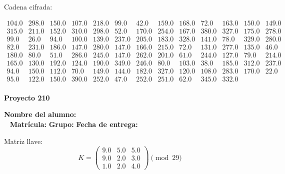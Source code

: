 \documentclass[12pt]{article}
\begin{document}
Cadena cifrada:
\begin{center}
$\begin{array}{lllllllllllll}
104.0 & 298.0 & 150.0 & 107.0 & 218.0 & 99.0 & 42.0 & 159.0 & 168.0 & 72.0 & 163.0 & 150.0 & 149.0\\
315.0 & 211.0 & 152.0 & 310.0 & 298.0 & 52.0 & 170.0 & 254.0 & 167.0 & 380.0 & 327.0 & 175.0 & 278.0\\
99.0 & 26.0 & 94.0 & 100.0 & 139.0 & 237.0 & 205.0 & 183.0 & 328.0 & 141.0 & 78.0 & 329.0 & 280.0\\
82.0 & 231.0 & 186.0 & 147.0 & 280.0 & 147.0 & 166.0 & 215.0 & 72.0 & 131.0 & 277.0 & 135.0 & 46.0\\
180.0 & 80.0 & 51.0 & 286.0 & 245.0 & 147.0 & 262.0 & 201.0 & 61.0 & 244.0 & 127.0 & 79.0 & 214.0\\
165.0 & 130.0 & 192.0 & 124.0 & 190.0 & 349.0 & 246.0 & 80.0 & 103.0 & 38.0 & 185.0 & 312.0 & 237.0\\
94.0 & 150.0 & 112.0 & 70.0 & 149.0 & 144.0 & 182.0 & 327.0 & 120.0 & 108.0 & 283.0 & 170.0 & 22.0\\
95.0 & 122.0 & 150.0 & 390.0 & 252.0 & 47.0 & 252.0 & 251.0 & 62.0 & 345.0 & 332.0\\
\end{array}$
\end{center}

\newpage


\textbf{Proyecto 210}

\textbf{Nombre del alumno:} \underline{\hspace{13cm}}\\\
\vspace{1cm}
\textbf{Matrícula:} \underline{\hspace{4cm}} \hspace{1cm}
\textbf{Grupo:} \underline{\hspace{2cm}}
\textbf{Fecha de entrega:} \underline{\hspace{2cm}}

\medskip

Matriz llave:
\[
K = \begin{pmatrix}
9.0 & 5.0 & 5.0\\
9.0 & 2.0 & 3.0\\
1.0 & 2.0 & 4.0
\end{pmatrix} \pmod{29}
\]
\end{document}
